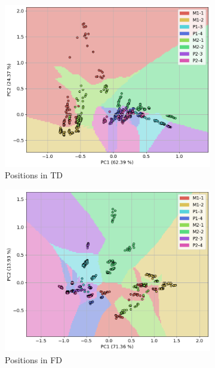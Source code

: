 \documentclass{llncs}
\begin{document}
\begin{figure}
	\centering
     \begin{subfigure}[b]{0.45\textwidth}
         \centering
         \includegraphics[width=\textwidth]{fig/scatter-pumps/position-td.png}
         \caption{Positions in TD}
     \end{subfigure}
     \hfill
     \begin{subfigure}[b]{0.45\textwidth}
         \centering
         \includegraphics[width=\textwidth]{fig/scatter-pumps/position-fd.png}
         \caption{Positions in FD}
     \end{subfigure}
     \hfill
     \begin{subfigure}[b]{0.45\textwidth}

\end{subfigure}
\end{figure}
\end{document}
